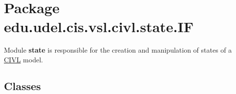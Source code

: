 \hypertarget{namespaceedu_1_1udel_1_1cis_1_1vsl_1_1civl_1_1state_1_1IF}{}\section{Package edu.\+udel.\+cis.\+vsl.\+civl.\+state.\+I\+F}
\label{namespaceedu_1_1udel_1_1cis_1_1vsl_1_1civl_1_1state_1_1IF}


Module {\bfseries state} is responsible for the creation and manipulation of states of a \hyperlink{classedu_1_1udel_1_1cis_1_1vsl_1_1civl_1_1CIVL}{C\+I\+V\+L} model.  


\subsection*{Classes}
